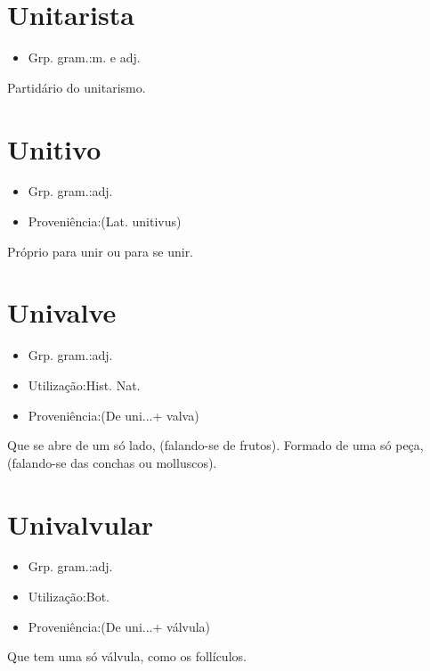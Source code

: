 \documentclass{article}
\begin{document}
\section{Unitarista}
\begin{itemize}
\item {Grp. gram.:m.  e  adj.}
\end{itemize}
Partidário do unitarismo.
\section{Unitivo}
\begin{itemize}
\item {Grp. gram.:adj.}
\end{itemize}
\begin{itemize}
\item {Proveniência:(Lat. \textunderscore unitivus\textunderscore )}
\end{itemize}
Próprio para unir ou para se unir.
\section{Univalve}
\begin{itemize}
\item {Grp. gram.:adj.}
\end{itemize}
\begin{itemize}
\item {Utilização:Hist. Nat.}
\end{itemize}
\begin{itemize}
\item {Proveniência:(De \textunderscore uni...\textunderscore  + \textunderscore valva\textunderscore )}
\end{itemize}
Que se abre de um só lado, (falando-se de frutos).
Formado de uma só peça, (falando-se das conchas ou molluscos).
\section{Univalvular}
\begin{itemize}
\item {Grp. gram.:adj.}
\end{itemize}
\begin{itemize}
\item {Utilização:Bot.}
\end{itemize}
\begin{itemize}
\item {Proveniência:(De \textunderscore uni...\textunderscore  + \textunderscore válvula\textunderscore )}
\end{itemize}
Que tem uma só válvula, como os follículos.
\end{document}
